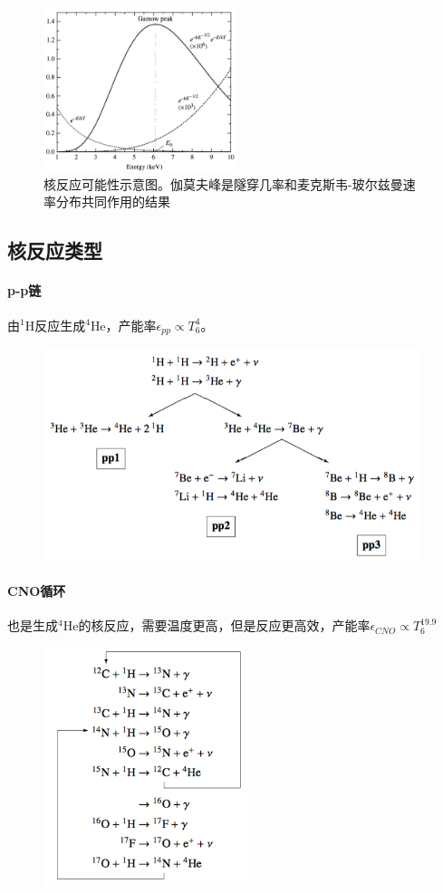 \documentclass[openany]{ctexbook}
\begin{document}
\begin{figure}[hbt]
  \centering
  \includegraphics[width=5.6cm]{chapters/10/gamowpeak}
  \caption{核反应可能性示意图。伽莫夫峰是隧穿几率和麦克斯韦-玻尔兹曼速率分布共同作用的结果}
  \label{fig:gamow}
\end{figure}

\newpage
\subsection{核反应类型}
\paragraph{p-p链}
由$^1$H反应生成$^4$He，产能率$\epsilon_{pp}\propto T_6^4$。
\begin{figure}[hbt]
  \centering
  \includegraphics[width=11cm]{chapters/10/ppchains}
  \label{}
\end{figure}


\paragraph{CNO循环}
也是生成$^4$He的核反应，需要温度更高，但是反应更高效，产能率$\epsilon_{CNO}\propto T_6^{19.9}$
\begin{figure}[hbt]
  \centering
  \includegraphics[width=6cm]{chapters/10/cno}
  \label{}
\end{figure}
\end{document}
